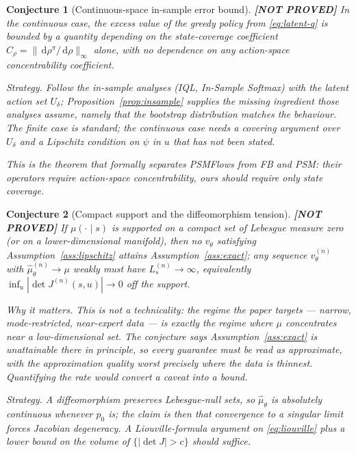 \documentclass[11pt]{article}
\theoremstyle{plain}
\newtheorem{conjecture}{Conjecture}
\theoremstyle{definition}
\theoremstyle{remark}
\newcommand{\1}{\mathbf 1}
\newcommand{\dd}{\,\mathrm d}
\newcommand{\muhat}{\hat\mu_\theta}
\newcommand{\Udelta}{U_\delta}
\newcommand{\NOTPROVED}{\textbf{\textup{[NOT PROVED]}}}
\begin{document}
\begin{conjecture}[Continuous-space in-sample error bound]
\label{conj:insample-bound}
\NOTPROVED\;
In the continuous case, the excess value of the greedy policy from
\eqref{eq:latent-q} is bounded by a quantity depending on the \emph{state}-coverage
coefficient $C_\rho=\|\dd\rho^{\pi}/\dd\rho\|_\infty$ alone, with no dependence on any
action-space concentrability coefficient.

\emph{Strategy.} Follow the in-sample analyses (IQL, In-Sample Softmax) with the latent
action set $\Udelta$; Proposition~\ref{prop:insample} supplies the missing ingredient those
analyses assume, namely that the bootstrap distribution matches the behaviour. The finite
case is standard; the continuous case needs a covering argument over $\Udelta$ and a
Lipschitz condition on $\psi$ in $u$ that has not been stated.

\emph{This is the theorem that formally separates PSMFlows from FB and PSM}: their
operators require action-space concentrability, ours should require only state coverage.
\end{conjecture}

\begin{conjecture}[Compact support and the diffeomorphism tension]
\label{conj:compact}
\NOTPROVED\;
If $\mu(\cdot\mid s)$ is supported on a compact set of Lebesgue measure zero (or on a
lower-dimensional manifold), then no $v_\theta$ satisfying
Assumption~\ref{ass:lipschitz} attains Assumption~\ref{ass:exact}; any sequence
$v_\theta^{(n)}$ with $\muhat^{(n)}\to\mu$ weakly must have
$L_s^{(n)}\to\infty$, equivalently $\inf_u|\det J^{(n)}(s,u)|\to 0$ off the support.

\emph{Why it matters.} This is not a technicality: the regime the paper targets --- narrow,
mode-restricted, near-expert data --- is exactly the regime where $\mu$ concentrates near a
low-dimensional set. The conjecture says Assumption~\ref{ass:exact} is unattainable there
in principle, so every guarantee must be read as approximate, with the approximation
quality worst precisely where the data is thinnest. Quantifying the rate would convert a
caveat into a bound.

\emph{Strategy.} A diffeomorphism preserves Lebesgue-null sets, so $\muhat$ is absolutely
continuous whenever $p_0$ is; the claim is then that convergence to a singular limit forces
Jacobian degeneracy. A Liouville-formula argument on \eqref{eq:liouville} plus a lower
bound on the volume of $\{|\det J|>c\}$ should suffice.
\end{conjecture}
\end{document}
